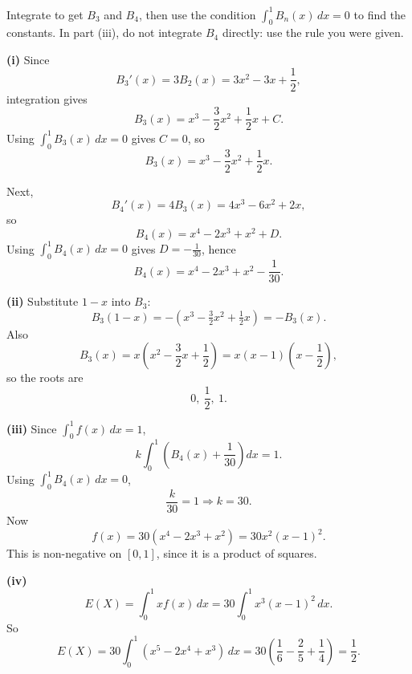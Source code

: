 \begin{problem}
\begin{enumerate}[label=(\roman*)]


\end{enumerate}
\end{problem}

\begin{hintbox}
Integrate to get $B_3$ and $B_4$, then use the condition $\int_0^1 B_n(x)\,dx=0$ to find the constants. In part (iii), do not integrate $B_4$ directly: use the rule you were given.
\end{hintbox}

\begin{solution}
\textbf{(i)} Since
\[
B_3'(x)=3B_2(x)=3x^2-3x+\frac12,
\]
integration gives
\[
B_3(x)=x^3-\frac32x^2+\frac12x+C.
\]
Using $\int_0^1 B_3(x)\,dx=0$ gives $C=0$, so
\[
\boxed{B_3(x)=x^3-\frac32x^2+\frac12x.}
\]

Next,
\[
B_4'(x)=4B_3(x)=4x^3-6x^2+2x,
\]
so
\[
B_4(x)=x^4-2x^3+x^2+D.
\]
Using $\int_0^1 B_4(x)\,dx=0$ gives $D=-\frac1{30}$, hence
\[
\boxed{B_4(x)=x^4-2x^3+x^2-\frac1{30}.}
\]

\textbf{(ii)} Substitute $1-x$ into $B_3$:
\[
B_3(1-x)=-(x^3-\tfrac32x^2+\tfrac12x)=-B_3(x).
\]
Also
\[
B_3(x)=x\left(x^2-\frac32x+\frac12\right)=x(x-1)\left(x-\frac12\right),
\]
so the roots are
\[
\boxed{0,\ \frac12,\ 1.}
\]

\textbf{(iii)} Since $\int_0^1 f(x)\,dx=1$,
\[
k\int_0^1\left(B_4(x)+\frac1{30}\right)dx=1.
\]
Using $\int_0^1 B_4(x)\,dx=0$,
\[
\frac{k}{30}=1 \Rightarrow \boxed{k=30.}
\]
Now
\[
f(x)=30\left(x^4-2x^3+x^2\right)=30x^2(x-1)^2.
\]
This is non-negative on $[0,1]$, since it is a product of squares.

\textbf{(iv)} 
\[
E(X)=\int_0^1 x f(x)\,dx
=30\int_0^1 x^3(x-1)^2\,dx.
\]
So
\[
E(X)=30\int_0^1 (x^5-2x^4+x^3)\,dx
=30\left(\frac16-\frac25+\frac14\right)
=\boxed{\frac12.}
\]
\end{solution}

